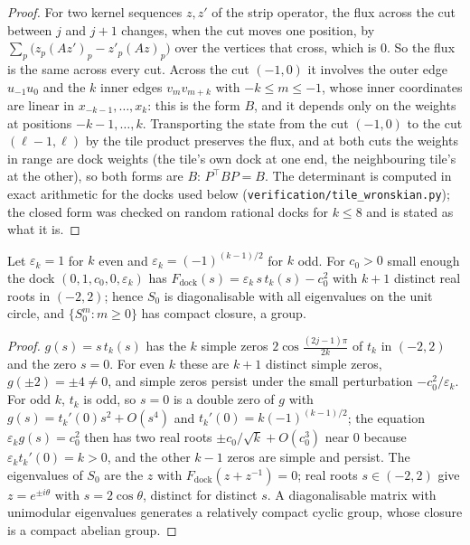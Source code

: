 \begin{proof}
For two kernel sequences $z,z'$ of the strip operator, the flux across the cut
between $j$ and $j+1$ changes, when the cut moves one position, by
$\sum_p\bigl(z_p(Az')_p-z'_p(Az)_p\bigr)$ over the vertices that cross, which is
$0$. So the flux is the same across every cut. Across the cut $(-1,0)$ it
involves the outer edge $u_{-1}u_0$ and the $k$ inner edges $v_mv_{m+k}$ with
$-k\le m\le-1$, whose inner coordinates are linear in $x_{-k-1},\dots,x_k$:
this is the form $B$, and it depends only on the weights at positions
$-k-1,\dots,k$. Transporting the state from the cut $(-1,0)$ to the cut
$(\ell-1,\ell)$ by the tile product preserves the flux, and at both cuts the
weights in range are dock weights (the tile's own dock at one end, the
neighbouring tile's at the other), so both forms are $B$: $P^{\!\top}BP=B$.
The determinant is computed in exact arithmetic for the docks used below
(\texttt{verification/tile\_wronskian.py}); the closed form was checked on
random rational docks for $k\le8$ and is stated as what it is.
\end{proof}

\begin{lemma}\label{lem:elliptic}
Let $\varepsilon_k=1$ for $k$ even and $\varepsilon_k=(-1)^{(k-1)/2}$ for $k$ odd.
For $c_0>0$ small enough the dock $(0,1,c_0,0,\varepsilon_k)$ has
$F_{\mathrm{dock}}(s)=\varepsilon_k\,s\,t_k(s)-c_0^{2}$ with $k+1$ distinct real
roots in $(-2,2)$; hence $S_0$ is diagonalisable with all eigenvalues on the
unit circle, and $\{S_0^m:m\ge0\}$ has compact closure, a group.
\end{lemma}

\begin{proof}
$g(s)=s\,t_k(s)$ has the $k$ simple zeros $2\cos\frac{(2j-1)\pi}{2k}$ of $t_k$
in $(-2,2)$ and the zero $s=0$. For even $k$ these are $k+1$ distinct simple
zeros, $g(\pm2)=\pm4\ne0$, and simple zeros persist under the small
perturbation $-c_0^2/\varepsilon_k$. For odd $k$, $t_k$ is odd, so $s=0$ is a
double zero of $g$ with $g(s)=t_k'(0)s^2+O(s^4)$ and $t_k'(0)=k(-1)^{(k-1)/2}$;
the equation $\varepsilon_kg(s)=c_0^2$ then has two real roots $\pm c_0/\sqrt{k}+O(c_0^3)$
near $0$ because $\varepsilon_kt_k'(0)=k>0$, and the other $k-1$ zeros are simple
and persist. The eigenvalues of $S_0$ are the $z$ with $F_{\mathrm{dock}}(z+z^{-1})=0$;
real roots $s\in(-2,2)$ give $z=e^{\pm i\theta}$ with $s=2\cos\theta$, distinct
for distinct $s$. A diagonalisable matrix with unimodular eigenvalues generates
a relatively compact cyclic group, whose closure is a compact abelian group.
\end{proof}

